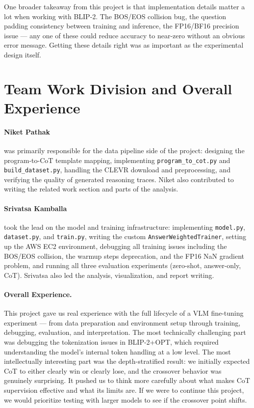 \documentclass[11pt,twocolumn]{article}
\begin{document}
One broader takeaway from this project is that implementation details matter a lot when working with BLIP-2. The BOS/EOS collision bug, the question padding consistency between training and inference, the FP16/BF16 precision issue — any one of these could reduce accuracy to near-zero without an obvious error message. Getting these details right was as important as the experimental design itself.

\section{Team Work Division and Overall Experience}

\paragraph{Niket Pathak} was primarily responsible for the data pipeline side of the project: designing the program-to-CoT template mapping, implementing \texttt{program\_to\_cot.py} and \texttt{build\_dataset.py}, handling the CLEVR download and preprocessing, and verifying the quality of generated reasoning traces. Niket also contributed to writing the related work section and parts of the analysis.

\paragraph{Srivatsa Kamballa} took the lead on the model and training infrastructure: implementing \texttt{model.py}, \texttt{dataset.py}, and \texttt{train.py}, writing the custom \texttt{AnswerWeightedTrainer}, setting up the AWS EC2 environment, debugging all training issues including the BOS/EOS collision, the warmup steps deprecation, and the FP16 NaN gradient problem, and running all three evaluation experiments (zero-shot, answer-only, CoT). Srivatsa also led the analysis, visualization, and report writing.

\paragraph{Overall Experience.} This project gave us real experience with the full lifecycle of a VLM fine-tuning experiment — from data preparation and environment setup through training, debugging, evaluation, and interpretation. The most technically challenging part was debugging the tokenization issues in BLIP-2+OPT, which required understanding the model's internal token handling at a low level. The most intellectually interesting part was the depth-stratified result: we initially expected CoT to either clearly win or clearly lose, and the crossover behavior was genuinely surprising. It pushed us to think more carefully about what makes CoT supervision effective and what its limits are. If we were to continue this project, we would prioritize testing with larger models to see if the crossover point shifts.



\end{document}
